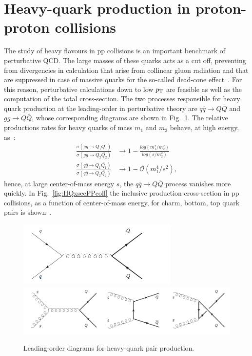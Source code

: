 \section{Heavy-quark production in proton-proton collisions}
The study of heavy flavours in pp collisions is an important benchmark of perturbative QCD. 
The large masses of these quarks acts as a cut off, preventing from divergencies in calculation that arise
from collinear gluon radiation and that are suppressed in case of massive quarks for the
so-called dead-cone effect~\cite{}. For this reason, perturbative calculations down to low $p_{\rm T}$ are feasible as well as the computation of the total cross-section. 
The two processes responsible for heavy quark production at the leading-order in perturbative theory are 
$q \bar{q} \rightarrow Q \bar{Q}$ and $gg \rightarrow Q \bar{Q}$, whose corresponding diagrams are
shown in Fig.~\ref{fig:LOdiagrams}. The relative productions rates for heavy quarks of mass 
$m_1$ and $m_2$ behave, at high energy, as~\cite{Mangano:1997ri}:
\begin{equation}
\begin{aligned}
\frac{\sigma (gg \rightarrow Q_1 \bar{Q_1})}{\sigma (gg \rightarrow Q_2 \bar{Q_2})} & \rightarrow 1 - \frac{log(m_1^2/m_2^2)}{log(s/m_2^2)} \\
\frac{\sigma (q \bar{q} \rightarrow Q_1 \bar{Q_1})}{\sigma (q \bar{q} \rightarrow Q_2 \bar{Q_2})} & \rightarrow 1 - \mathcal{O} (m_1^4/s^2),
\end{aligned}
\end{equation}
hence, at large center-of-mass energy $s$, the $q \bar{q} \rightarrow Q \bar{Q}$ process
vanishes more quickly. In Fig.~\ref{fig:HQxsecPPcoll} the inclusive production cross-section in pp collisions,
as a function of center-of-mass energy, for charm, bottom, top quark pairs is shown~\cite{Mangano:1997ri}.
\begin{figure}[!ht]
  \centering
  \includegraphics[width=8cm]{FigCap2/Feymann1.png}
  \includegraphics[width=15cm]{FigCap2/Feymann2.png}
  \caption{Leading-order diagrams for heavy-quark pair production.}
  \label{fig:LOdiagrams}
\end{figure}
